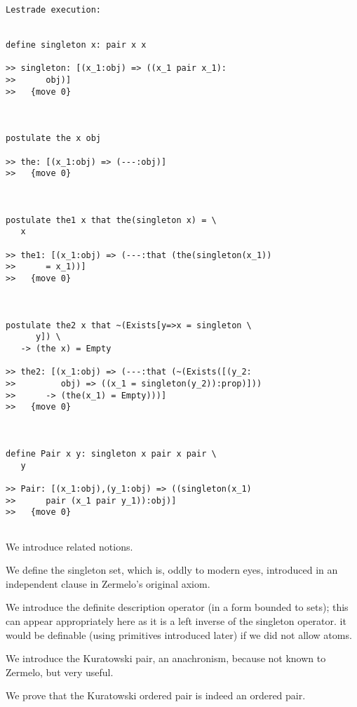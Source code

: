 \documentclass{article}
\begin{document}
\begin{verbatim}Lestrade execution:


define singleton x: pair x x

>> singleton: [(x_1:obj) => ((x_1 pair x_1):
>>      obj)]
>>   {move 0}



postulate the x obj

>> the: [(x_1:obj) => (---:obj)]
>>   {move 0}



postulate the1 x that the(singleton x) = \
   x

>> the1: [(x_1:obj) => (---:that (the(singleton(x_1))
>>      = x_1))]
>>   {move 0}



postulate the2 x that ~(Exists[y=>x = singleton \
      y]) \
   -> (the x) = Empty

>> the2: [(x_1:obj) => (---:that (~(Exists([(y_2:
>>         obj) => ((x_1 = singleton(y_2)):prop)]))
>>      -> (the(x_1) = Empty)))]
>>   {move 0}



define Pair x y: singleton x pair x pair \
   y

>> Pair: [(x_1:obj),(y_1:obj) => ((singleton(x_1)
>>      pair (x_1 pair y_1)):obj)]
>>   {move 0}


\end{verbatim}

We introduce related notions.

We define the singleton set, which is, oddly to modern eyes, introduced in an independent clause in Zermelo's original axiom.

We introduce the definite description operator (in a form bounded to sets);  this can appear appropriately here as it is a left inverse of the singleton operator.  it would be definable
(using primitives introduced later) if we did not allow atoms.

We introduce the Kuratowski pair, an anachronism, because not known to Zermelo, but very useful.

We prove that the Kuratowski ordered pair is indeed an ordered pair.
\end{document}
